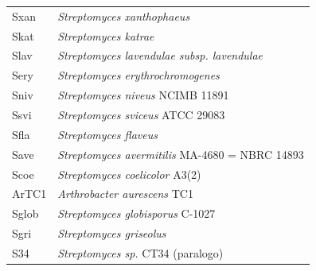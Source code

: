 \documentclass[12pt,twoside]{reedthesis}
\begin{document}
\begin{longtable}[]{@{}ll@{}}
  Sxan & \emph{Streptomyces xanthophaeus}\tabularnewline
  Skat & \emph{Streptomyces katrae}\tabularnewline
  Slav & \emph{Streptomyces lavendulae subsp. lavendulae}\tabularnewline
  Sery & \emph{Streptomyces erythrochromogenes}\tabularnewline
  Sniv & \emph{Streptomyces niveus} NCIMB 11891\tabularnewline
  Ssvi & \emph{Streptomyces sviceus} ATCC 29083\tabularnewline
  Sfla & \emph{Streptomyces flaveus}\tabularnewline
  Save & \emph{Streptomyces avermitilis} MA-4680 = NBRC
  14893\tabularnewline
  Scoe & \emph{Streptomyces coelicolor} A3(2)\tabularnewline
  ArTC1 & \emph{Arthrobacter aurescens} TC1\tabularnewline
  Sglob & \emph{Streptomyces globisporus} C-1027\tabularnewline
  Sgri & \emph{Streptomyces griseolus}\tabularnewline
  S34 & \emph{Streptomyces sp. } CT34 (paralogo)\tabularnewline
  \bottomrule
  \end{longtable}
  
\end{document}
